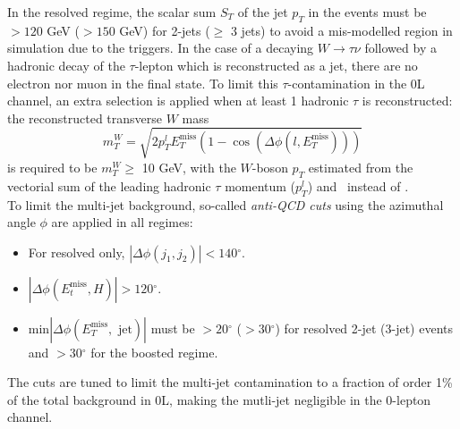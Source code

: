 In the resolved regime, the scalar sum $S_T$ of the jet $p_T$ in the events must be $> 120$ GeV ($> 150$ GeV) for 2-jets ($\geq$ 3 jets) to avoid a mis-modelled region in simulation due to the triggers. In the case of a decaying $W \rightarrow \tau \nu$ followed by a hadronic decay of the $\tau$-lepton which is reconstructed as a jet, there are no electron nor muon in the final state. To limit this $\tau$-contamination in the 0L channel, an extra selection is applied when at least 1 hadronic $\tau$ is reconstructed: the reconstructed transverse $W$ mass \[ m_T^W = \sqrt{2 p_T^l E_T^{\textrm{miss}} (1 - \cos(\Delta \phi(l, E_T^{\textrm{miss}} ) ) ) } \] is required to be $m_T^W \geq$ 10 GeV, with the $W$-boson $p_T$ estimated from the vectorial sum of the leading hadronic $\tau$ momentum ($p_T^l$) and \etm\ instead of \ptv.\\

To limit the multi-jet background, so-called \textit{anti-QCD cuts} using the azimuthal angle $\phi$ are applied in all regimes:
\begin{itemize} %
    \item For resolved only, $|\Delta \phi(j_1, j_2)| < 140 \ensuremath{^\circ}$.
    \item $|\Delta \phi(E_t^{\textrm{miss}}, H)| > 120 \ensuremath{^\circ}$.
    \item $\textrm{min}|\Delta \phi (E_T^{\textrm{miss}}, \textrm{ jet})|$ must be $> 20\ensuremath{^\circ}$ ($> 30 \ensuremath{^\circ}$) for resolved 2-jet (3-jet) events and $> 30\ensuremath{^\circ}$ for the boosted regime.
\end{itemize}
The cuts are tuned to limit the multi-jet contamination to a fraction of order 1\% of the total background in 0L, making the mutli-jet negligible in the 0-lepton channel. 

